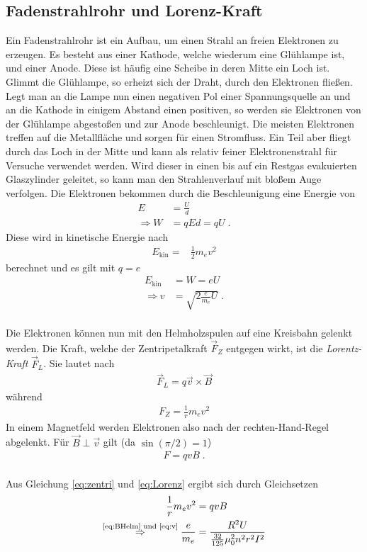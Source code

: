 \documentclass[12pt,a4paper,titlepage,headinclude,bibtotoc]{scrartcl}
\numberwithin{equation}{section}
\begin{document}
\subsection{Fadenstrahlrohr und Lorenz-Kraft}
Ein Fadenstrahlrohr ist ein Aufbau, um einen Strahl an freien Elektronen zu erzeugen.
Es besteht aus einer Kathode, welche wiederum eine Glühlampe ist, und einer Anode.
Diese ist häufig eine Scheibe in deren Mitte ein Loch ist.
Glimmt die Glühlampe, so erheizt sich der Draht, durch den Elektronen fließen.
Legt man an die Lampe nun einen negativen Pol einer Spannungsquelle an und an die Kathode in einigem Abstand einen positiven, so werden sie Elektronen von der Glühlampe abgestoßen und zur Anode beschleunigt.
Die meisten Elektronen treffen auf die Metallfläche und sorgen für einen Stromfluss.
Ein Teil aber fliegt durch das Loch in der Mitte und kann als relativ feiner Elektronenstrahl für Versuche verwendet werden.
Wird dieser in einen bis auf ein Restgas evakuierten Glaszylinder geleitet, so kann man den Strahlenverlauf mit bloßem Auge verfolgen.
Die Elektronen bekommen durch die Beschleunigung eine Energie von
\begin{align*}
	E&=\frac{U}{d}\\
	\Rightarrow W&=qEd=qU\; .
\end{align*}
Diese wird in kinetische Energie nach
\begin{align*}
	E_\text{kin}=&\frac{1}{2}m_ev^2
\end{align*}
berechnet und es gilt mit $q=e$
\begin{align}
	E_\text{kin}&=W=eU\\
	\Rightarrow v&=\sqrt{2\frac{e}{m_e}U}\;. \label{eq:v}
\end{align}
\\
Die Elektronen können nun mit den Helmholzspulen auf eine Kreisbahn gelenkt werden.
Die Kraft, welche der Zentripetalkraft $\vec F_Z$ entgegen wirkt, ist die \emph{Lorentz-Kraft} $\vec F_L$.
Sie lautet nach \cite[S. 368]{gerthsen}
\begin{align*}
	\vec F_L=q\vec v\times\vec B
\end{align*}
während
\begin{align}
	F_Z=\frac{1}{r}m_ev^2\label{eq:zentri}
\end{align}
In einem Magnetfeld werden Elektronen also nach der rechten-Hand-Regel abgelenkt.
Für $\vec B\perp \vec v$ gilt (da $\sin(\pi/2)=1$)
\begin{align}
	F=qvB\; . \label{eq:Lorenz}
\end{align}
\\
Aus Gleichung \eqref{eq:zentri} und \eqref{eq:Lorenz} ergibt sich durch Gleichsetzen
\begin{align}
	\frac{1}{r}m_ev^2&=qvB\label{eq:ZgleichL}\\
	\stackrel{\text{\eqref{eq:BHelm} und \eqref{eq:v}}}{\Rightarrow} \frac{e}{m_e}&=\frac{R^2U}{\frac{32}{125}\mu_0^2n^2r^2I^2}\label{eq:em}
\end{align}
\end{document}
